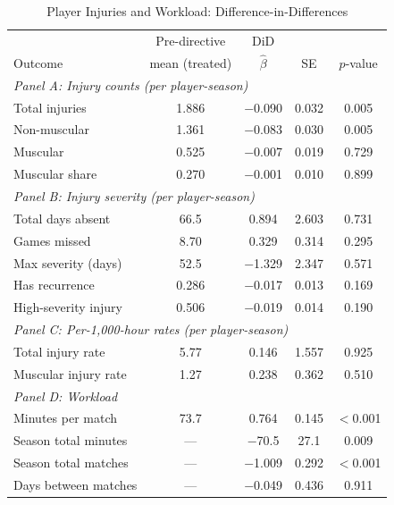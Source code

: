 
\begin{table}[t]
\centering
\begin{threeparttable}
\caption{Player Injuries and Workload: Difference-in-Differences}
\label{tab:injuries}
\small
\begin{tabular}{lcccc}
\toprule
& Pre-directive & DiD & & \\
Outcome & mean (treated) & $\hat{\beta}$ & SE & $p$-value \\
\midrule
\multicolumn{5}{l}{\textit{Panel A: Injury counts (per player-season)}} \\[4pt]
Total injuries & 1.886 & $-$0.090 & 0.032 & 0.005 \\
\quad Non-muscular & 1.361 & $-$0.083 & 0.030 & 0.005 \\
\quad Muscular & 0.525 & $-$0.007 & 0.019 & 0.729 \\
Muscular share & 0.270 & $-$0.001 & 0.010 & 0.899 \\[6pt]
\multicolumn{5}{l}{\textit{Panel B: Injury severity (per player-season)}} \\[4pt]
Total days absent & 66.5 & 0.894 & 2.603 & 0.731 \\
Games missed & 8.70 & 0.329 & 0.314 & 0.295 \\
Max severity (days) & 52.5 & $-$1.329 & 2.347 & 0.571 \\
Has recurrence & 0.286 & $-$0.017 & 0.013 & 0.169 \\
High-severity injury & 0.506 & $-$0.019 & 0.014 & 0.190 \\[6pt]
\multicolumn{5}{l}{\textit{Panel C: Per-1,000-hour rates (per player-season)}} \\[4pt]
Total injury rate & 5.77 & 0.146 & 1.557 & 0.925 \\
Muscular injury rate & 1.27 & 0.238 & 0.362 & 0.510 \\[6pt]
\multicolumn{5}{l}{\textit{Panel D: Workload}} \\[4pt]
Minutes per match & 73.7 & 0.764 & 0.145 & $<$0.001 \\
Season total minutes & --- & $-$70.5 & 27.1 & 0.009 \\
Season total matches & --- & $-$1.009 & 0.292 & $<$0.001 \\
Days between matches & --- & $-$0.049 & 0.436 & 0.911 \\
\bottomrule
\end{tabular}

\end{threeparttable}
\end{table}
